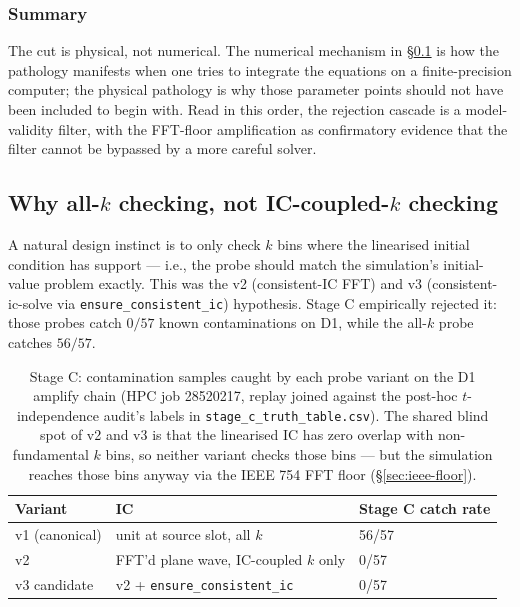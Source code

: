 \subsubsection{Summary}

The cut is physical, not numerical. The numerical mechanism in
\S\ref{sec:why-all-k} is how the pathology manifests when one tries
to integrate the equations on a finite-precision computer; the
physical pathology is why those parameter points should not have been
included to begin with. Read in this order, the rejection cascade is
a model-validity filter, with the FFT-floor amplification as
confirmatory evidence that the filter cannot be bypassed by a more
careful solver.

\subsection{Why all-$k$ checking, not IC-coupled-$k$ checking}
\label{sec:why-all-k}

A natural design instinct is to only check $k$ bins where the
linearised initial condition has support --- i.e., the probe should
match the simulation's initial-value problem exactly. This was the v2
(consistent-IC FFT) and v3 (consistent-ic-solve via
\texttt{ensure\_consistent\_ic}) hypothesis. Stage C empirically
rejected it: those probes catch $0/57$ known contaminations on D1,
while the all-$k$ probe catches $56/57$.

\begin{table}[ht]
\centering
\begin{tabular}{lll}
\toprule
\textbf{Variant} & \textbf{IC} & \textbf{Stage C catch rate} \\
\midrule
v1 (canonical) & unit at source slot, all $k$ & 56/57 \\
v2 & FFT'd plane wave, IC-coupled $k$ only & 0/57 \\
v3 candidate & v2 + \texttt{ensure\_consistent\_ic} & 0/57 \\
\bottomrule
\end{tabular}
\caption{Stage C: contamination samples caught by each probe variant
on the D1 amplify chain (HPC job 28520217, replay joined against the
post-hoc $t$-independence audit's labels in
\texttt{stage\_c\_truth\_table.csv}). The shared blind spot of v2 and
v3 is that the linearised IC has zero overlap with non-fundamental $k$
bins, so neither variant checks those bins --- but the simulation
reaches those bins anyway via the IEEE 754 FFT floor (\S\ref{sec:ieee-floor}).}
\label{tab:stage-c}
\end{table}

